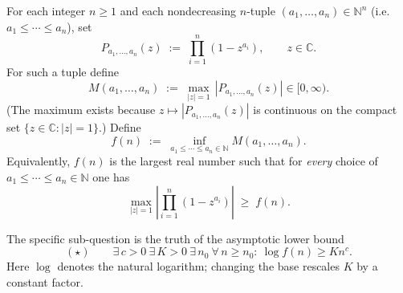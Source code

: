 For each integer $n\ge 1$ and each nondecreasing $n$-tuple $(a_1,\dots,a_n)\in\mathbb{N}^n$ (i.e. $a_1\le\cdots\le a_n$), set
\[
P_{a_1,\dots,a_n}(z) \;:=\; \prod_{i=1}^n (1-z^{a_i}),\qquad z\in\mathbb{C}.
\]
For such a tuple define
\[
M(a_1,\dots,a_n)\;:=\;\max_{\left\lvert z\right\rvert=1}\,\left\lvert P_{a_1,\dots,a_n}(z)\right\rvert\in[0,\infty).
\]
(The maximum exists because $z\mapsto\left\lvert P_{a_1,\dots,a_n}(z)\right\rvert$ is continuous on the compact set $\{z\in\mathbb{C}:\left\lvert z\right\rvert=1\}$.)
Define
\[
f(n)\;:=\;\inf_{a_1\le\cdots\le a_n\in\mathbb{N}} M(a_1,\dots,a_n).
\]
Equivalently, $f(n)$ is the largest real number such that for \emph{every} choice of $a_1\le\cdots\le a_n\in\mathbb{N}$ one has
\[
\max_{\left\lvert z\right\rvert=1}\left\lvert \prod_{i=1}^n (1-z^{a_i})\right\rvert\;\ge\; f(n).
\]

The specific sub-question is the truth of the asymptotic lower bound
\[
(\star)\qquad \exists\,c>0\ \exists\,K>0\ \exists\,n_0\ \forall\,n\ge n_0:\ \log f(n)\ge K n^c.
\]
Here $\log$ denotes the natural logarithm; changing the base rescales $K$ by a constant factor.
